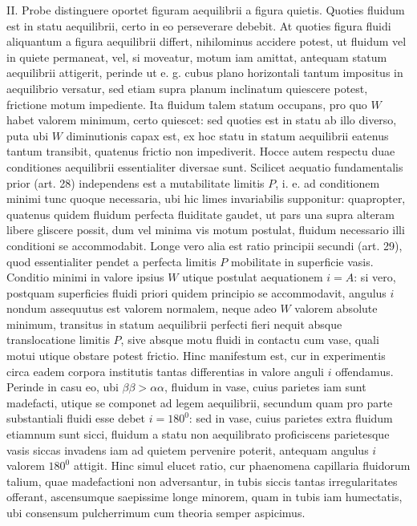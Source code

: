II. Probe distinguere oportet figuram aequilibrii a figura quietis. Quoties fluidum est in statu aequilibrii, certo in eo perseverare debebit. At quoties figura fluidi aliquantum a figura aequilibrii differt, nihilominus accidere potest, ut fluidum vel in quiete permaneat, vel, si moveatur, motum iam amittat, antequam statum aequilibrii attigerit, perinde ut e. g. cubus plano horizontali tantum impositus in aequilibrio versatur, sed etiam supra planum inclinatum quiescere potest, frictione motum impediente. Ita fluidum talem statum occupans, pro quo $W$ habet valorem minimum, certo quiescet: sed quoties est in statu ab illo diverso, puta ubi $W$ diminutionis capax est, ex hoc statu in statum aequilibrii eatenus tantum transibit, quatenus frictio non impediverit. Hocce autem respectu duae conditiones aequilibrii essentialiter diversae sunt. Scilicet aequatio fundamentalis prior (art. 28) independens est a mutabilitate limitis $P$, i. e. ad conditionem minimi tunc quoque necessaria, ubi hic limes invariabilis supponitur: quapropter, quatenus quidem fluidum perfecta fluiditate gaudet, ut pars una supra alteram libere gliscere possit, dum vel minima vis motum postulat, fluidum necessario illi conditioni se accommodabit. Longe vero alia est ratio principii secundi (art. 29), quod essentialiter pendet a perfecta limitis $P$ mobilitate in superficie vasis. Conditio minimi in valore ipsius $W$ utique postulat aequationem $i=A$: si vero, postquam superficies fluidi priori quidem principio se accommodavit, angulus $i$ nondum assequutus est valorem normalem, neque adeo $W$ valorem absolute minimum, transitus in statum aequilibrii perfecti fieri nequit absque translocatione limitis $P$, sive absque motu fluidi in contactu cum vase, quali motui utique obstare potest frictio. Hinc manifestum est, cur in experimentis circa eadem corpora institutis tantas differentias in valore anguli $i$ offendamus. Perinde in casu eo, ubi $\beta\beta>\alpha\alpha$, fluidum in vase, cuius parietes iam sunt madefacti, utique se componet ad legem aequilibrii, secundum quam pro parte substantiali fluidi esse debet $i=180^0$: sed in vase, cuius parietes extra fluidum etiamnum sunt sicci, fluidum a statu non aequilibrato proficiscens parietesque vasis siccas invadens iam ad quietem pervenire poterit, antequam angulus $i$ valorem $180^0$ attigit. Hinc simul elucet ratio, cur phaenomena capillaria fluidorum talium, quae madefactioni non adversantur, in tubis siccis tantas irregularitates offerant, ascensumque saepissime longe minorem, quam in tubis iam humectatis, ubi consensum pulcherrimum cum theoria semper aspicimus.

